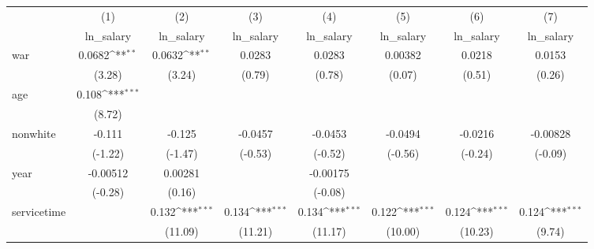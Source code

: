 {
\def\sym#1{\ifmmode^{#1}\else\(^{#1}\)\fi}
\begin{tabular}{l*{7}{c}}
\hline\hline
            &\multicolumn{1}{c}{(1)}&\multicolumn{1}{c}{(2)}&\multicolumn{1}{c}{(3)}&\multicolumn{1}{c}{(4)}&\multicolumn{1}{c}{(5)}&\multicolumn{1}{c}{(6)}&\multicolumn{1}{c}{(7)}\\
            &\multicolumn{1}{c}{ln\_salary}&\multicolumn{1}{c}{ln\_salary}&\multicolumn{1}{c}{ln\_salary}&\multicolumn{1}{c}{ln\_salary}&\multicolumn{1}{c}{ln\_salary}&\multicolumn{1}{c}{ln\_salary}&\multicolumn{1}{c}{ln\_salary}\\
\hline
war         &      0.0682\sym{**} &      0.0632\sym{**} &      0.0283         &      0.0283         &     0.00382         &      0.0218         &      0.0153         \\
            &      (3.28)         &      (3.24)         &      (0.79)         &      (0.78)         &      (0.07)         &      (0.51)         &      (0.26)         \\
[1em]
age         &       0.108\sym{***}&                     &                     &                     &                     &                     &                     \\
            &      (8.72)         &                     &                     &                     &                     &                     &                     \\
[1em]
nonwhite    &      -0.111         &      -0.125         &     -0.0457         &     -0.0453         &     -0.0494         &     -0.0216         &    -0.00828         \\
            &     (-1.22)         &     (-1.47)         &     (-0.53)         &     (-0.52)         &     (-0.56)         &     (-0.24)         &     (-0.09)         \\
[1em]
year        &    -0.00512         &     0.00281         &                     &    -0.00175         &                     &                     &                     \\
            &     (-0.28)         &      (0.16)         &                     &     (-0.08)         &                     &                     &                     \\
[1em]
servicetime &                     &       0.132\sym{***}&       0.134\sym{***}&       0.134\sym{***}&       0.122\sym{***}&       0.124\sym{***}&       0.124\sym{***}\\
            &                     &     (11.09)         &     (11.21)         &     (11.17)         &     (10.00)         &     (10.23)         &      (9.74)         \\

\end{tabular}}
